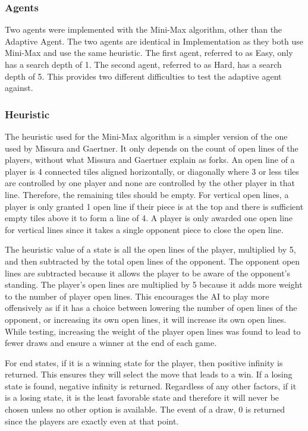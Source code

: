 \documentclass[12pt]{article}
\begin{document}
\subsubsection*{Agents}
Two agents were implemented with the Mini-Max algorithm, other than the Adaptive Agent. The two agents are identical in Implementation as they both use Mini-Max and use the same heuristic. The first agent, referred to as Easy, only has a search depth of 1. The second agent, referred to as Hard, has a search depth of 5. This provides two different difficulties to test the adaptive agent against.

\subsubsection*{Heuristic}
The heuristic used for the Mini-Max algorithm is a simpler version of the one used by Missura and Gaertner. It only depends on the count of open lines of the players, without what Missura and Gaertner explain as forks. An open line of a player is 4 connected tiles aligned horizontally, or diagonally where 3 or less tiles are controlled by one player and none are controlled by the other player in that line. Therefore, the remaining tiles should be empty. For vertical open lines, a player is only granted 1 open line if their piece is at the top and there is sufficient empty tiles above it to form a line of 4. A player is only awarded one open line for vertical lines since it takes a single opponent piece to close the open line.

The heuristic value of a state is all the open lines of the player, multiplied by 5, and then subtracted by the total open lines of the opponent. The opponent open lines are subtracted because it allows the player to be aware of the opponent's standing. The player's open lines are multiplied by 5 because it adds more weight to the number of player open lines. This encourages the AI to play more offensively as if it has a choice between lowering the number of open lines of the opponent, or increasing its own open lines, it will increase its own open lines. While testing, increasing the weight of the player open lines was found to lead to fewer draws and ensure a winner at the end of each game.

For end states, if it is a winning state for the player, then positive infinity is returned. This ensures they will select the move that leads to a win. If a losing state is found, negative infinity is returned. Regardless of any other factors, if it is a losing state, it is the least favorable state and therefore it will never be chosen unless no other option is available. The event of a draw, 0 is returned since the players are exactly even at that point.
\end{document}

